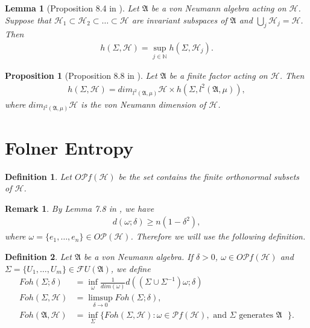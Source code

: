 \documentclass[a4paper,10pt]{amsart}
\newtheorem{proposition}{Proposition}[section]
\newtheorem{definition}{Definition}[section]
\newtheorem{lemma}{Lemma}[section]
\newtheorem{remark}{Remark}[section]
\newcommand{\AAA}{\mathfrak A}
\newcommand{\HHH}{\mathscr H} %
\newcommand{\PP}{\mathscr P}
\newcommand{\FF}{\mathscr F}
\newcommand{\N}{\mathbb N} %
\begin{document}
\begin{lemma}[Proposition 8.4 in \cite{V}]
    Let $\AAA$ be a von Neumann algebra acting on $\HHH$. Suppose that 
    $\HHH_{1} \subset \HHH_2 \subset \ldots  \subset \HHH$ are invariant 
    subspaces of $\AAA$ and $\bigcup_{j}\HHH_{j} = \HHH$. Then
    \begin{align*}
        h(\Sigma, \HHH) = \sup_{j \in \N}h(\Sigma, \HHH_{j}). 
    \end{align*}
\end{lemma}

\begin{proposition}[Proposition 8.8 in \cite{V}]
   Let $\AAA$ be a finite factor acting on $\HHH$. Then
   \begin{align*}
       h(\Sigma, \HHH) = dim_{l^{2}(\AAA, \mu)}\HHH \times h(\Sigma, l^{2}(\AAA, \mu)),  
   \end{align*}
   where $dim_{l^{2}(\AAA, \mu)}\HHH$ is the von Neumann dimension of $\HHH$.
\end{proposition}

\section{Folner Entropy}
\begin{definition}
   Let $O\PP f(\HHH)$ be the set contains the finite orthonormal subsets of $\HHH$.
\end{definition}


\begin{remark}
    By Lemma 7.8 in \cite{V}, we have
    \begin{align*}
        d(\omega; \delta) \geq n(1-\delta^2), 
    \end{align*}
    where $\omega = \{e_1, \ldots, e_n \} \in O\PP(\HHH)$. Therefore we will use the
    following definition.
\end{remark}

\begin{definition}
    Let $\AAA$ be a von Neumann algebra.
    If $\delta > 0$, $\omega \in O\PP f(\HHH)$ and 
    $\Sigma = \{U_1, \ldots, U_m \} \in 
    \FF U(\AAA)$, we define
    \begin{align*}
        Foh(\Sigma; \delta) &= \inf_{\omega}
           \frac{1}{dim(\omega)}d\left 
           ((\Sigma \cup \Sigma^{-1})\omega
            ; \delta \right ) \\
        Foh(\Sigma, \HHH) &= \limsup\limits_{\delta \rightarrow 0}Foh(\Sigma; \delta),\\
        Foh(\AAA, \HHH) &= \inf_{\Sigma}\{Foh(\Sigma, \HHH): 
            \omega \in \PP f(\HHH), \mbox{ and $\Sigma$ generates
        $\AAA$ } \}.
    \end{align*}
\end{definition}
\end{document}
